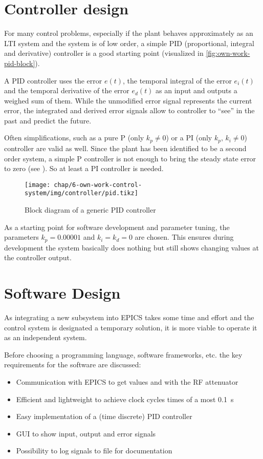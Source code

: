 \FloatBarrier
\section{Controller design}
For many control problems, especially if the plant behaves approximately as an LTI system and the system is of low order, a simple PID (proportional, integral and derivative) controller is a good starting point (visualized in \autoref{fig:own-work-pid-block}). 

A PID controller uses the error $e(t)$, the temporal integral of the error $e_i(t)$ and the temporal derivative of the error $e_d(t)$ as an input and outputs a weighed sum of them. While the unmodified error signal represents the current error, the integrated and derived error signals allow to controller to ``see'' in the past and predict the future.

Often simplifications, such as a pure P (only $k_p \neq 0$) or a PI (only $k_p,\,k_i \neq 0$) controller are valid as well. Since the plant has been identified to be a second order system, a simple P controller is not enough to bring the steady state error to zero (see ). So at least a PI controller is needed.

\begin{figure}[tb]
	\centering
	\texttt{[image: chap/6-own-work-control-system/img/controller/pid.tikz]}
	\caption{Block diagram of a generic PID controller}
	\label{fig:own-work-pid-block}
\end{figure}

As a starting point for software development and parameter tuning, the parameters $k_p=0.00001$ and $k_i=k_d=0$ are chosen. This ensures during development the system basically does nothing but still shows changing values at the controller output.

\FloatBarrier
\section{Software Design}
As integrating a new subsystem into EPICS takes some time and effort and the control system is designated a temporary solution, it is more viable to operate it as an independent system.

Before choosing a programming language, software frameworks, etc. the key requirements for the software are discussed:
\begin{itemize}
\item Communication with EPICS to get values and with the RF attenuator
\item Efficient and lightweight to achieve clock cycles times of a most \SI{0.1}{\second}
\item Easy implementation of a (time discrete) PID controller
\item GUI to show input, output and error signals
\item Possibility to log signals to file for documentation
\end{itemize}

